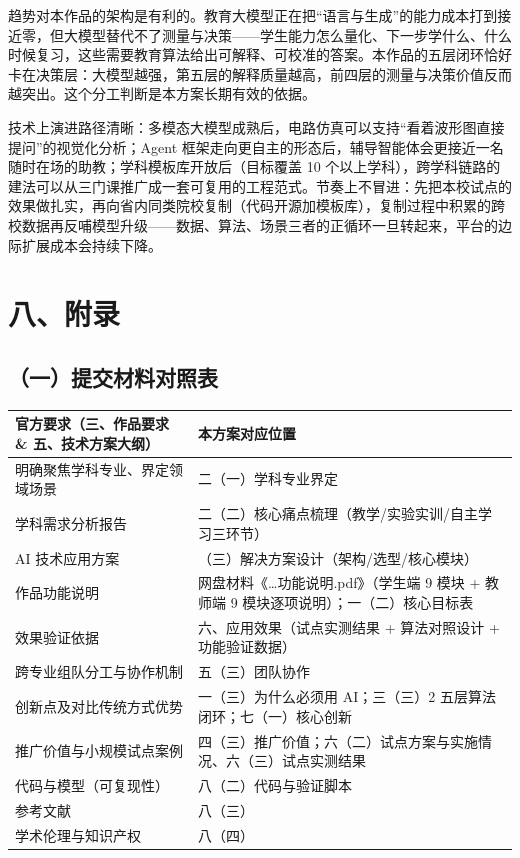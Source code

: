 \documentclass[zihao=-4,a4paper,UTF8,fontset=windows]{ctexart}
\begin{document}
趋势对本作品的架构是有利的。教育大模型正在把“语言与生成”的能力成本打到接近零，但大模型替代不了测量与决策——学生能力怎么量化、下一步学什么、什么时候复习，这些需要教育算法给出可解释、可校准的答案。本作品的五层闭环恰好卡在决策层：大模型越强，第五层的解释质量越高，前四层的测量与决策价值反而越突出。这个分工判断是本方案长期有效的依据。



技术上演进路径清晰：多模态大模型成熟后，电路仿真可以支持“看着波形图直接提问”的视觉化分析；Agent 框架走向更自主的形态后，辅导智能体会更接近一名随时在场的助教；学科模板库开放后（目标覆盖 10 个以上学科），跨学科链路的建法可以从三门课推广成一套可复用的工程范式。节奏上不冒进：先把本校试点的效果做扎实，再向省内同类院校复制（代码开源加模板库），复制过程中积累的跨校数据再反哺模型升级——数据、算法、场景三者的正循环一旦转起来，平台的边际扩展成本会持续下降。

\par\noindent\begin{minipage}{\linewidth}
\section{八、附录}
\subsection{（一）提交材料对照表}
\par\noindent\begin{tabular}{|p{7.08cm}|p{7.08cm}|}
\hline
\textbf{官方要求（三、作品要求 \& 五、技术方案大纲）} & \textbf{本方案对应位置} \\ \hline
明确聚焦学科专业、界定领域场景 & 二（一）学科专业界定 \\ \hline
学科需求分析报告 & 二（二）核心痛点梳理（教学/实验实训/自主学习三环节） \\ \hline
AI 技术应用方案 & （三）解决方案设计（架构/选型/核心模块） \\ \hline
作品功能说明 & 网盘材料《\dots{}功能说明.pdf》（学生端 9 模块 + 教师端 9 模块逐项说明）；一（二）核心目标表 \\ \hline
效果验证依据 & 六、应用效果（试点实测结果 + 算法对照设计 + 功能验证数据） \\ \hline
跨专业组队分工与协作机制 & 五（三）团队协作 \\ \hline
创新点及对比传统方式优势 & 一（三）为什么必须用 AI；三（三）2 五层算法闭环；七（一）核心创新 \\ \hline
推广价值与小规模试点案例 & 四（三）推广价值；六（二）试点方案与实施情况、六（三）试点实测结果 \\ \hline
代码与模型（可复现性） & 八（二）代码与验证脚本 \\ \hline
参考文献 & 八（三） \\ \hline
学术伦理与知识产权 & 八（四） \\ \hline
\end{tabular}\par
\end{minipage}\par
\end{document}
